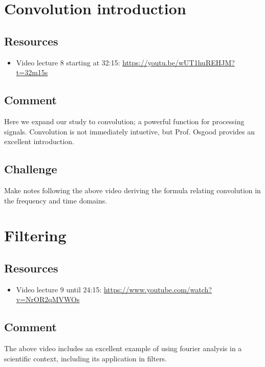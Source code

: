 \newpage
\section{Convolution introduction}

\subsection*{Resources}
\begin{itemize}
    \item Video lecture 8 starting at 32:15: \url{https://youtu.be/wUT1huREHJM?t=32m15s}
\end{itemize}

\subsection*{Comment}
Here we expand our study to convolution; a powerful function for processing signals. Convolution is not immediately intuetive, but Prof. Osgood provides an excellent introduction.

\subsection*{Challenge}
Make notes following the above video deriving the formula relating convolution in the frequency and time domains.

\timebox




\newpage
\section{Filtering}

\subsection*{Resources}
\begin{itemize}
    \item Video lecture 9 until 24:15: \url{https://www.youtube.com/watch?v=NrOR2qMVWOs}
\end{itemize}

\subsection*{Comment}
The above video includes an excellent example of using fourier analysis in a scientific context, including its application in filters.

